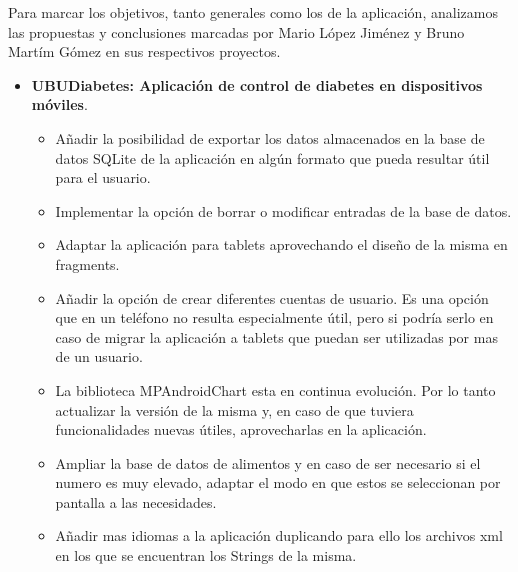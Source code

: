 
Para marcar los objetivos, tanto generales como los de la aplicación, analizamos las propuestas y conclusiones marcadas por Mario López Jiménez y Bruno Martím Gómez en sus respectivos proyectos.

\begin{itemize}
	\item  \textbf{UBUDiabetes: Aplicación de control de diabetes en dispositivos móviles}\cite{mario2016}.
	\begin{itemize}
		\item Añadir la posibilidad de exportar los datos almacenados en la base de datos SQLite de la aplicación en algún formato que pueda resultar útil para el usuario.
	\item Implementar la opción de borrar o modificar entradas de la base de datos.
	\item Adaptar la aplicación para tablets aprovechando el diseño de la misma en fragments.
	\item Añadir la opción de crear diferentes cuentas de usuario. Es una opción que en un teléfono no resulta especialmente útil, pero si podría serlo en caso de migrar la aplicación a tablets que puedan ser utilizadas por mas de un usuario.
	\item La biblioteca MPAndroidChart esta en continua evolución. Por lo tanto actualizar la versión de la misma y, en caso de que tuviera funcionalidades nuevas útiles, aprovecharlas en la aplicación.
	\item Ampliar la base de datos de alimentos y en caso de ser necesario si el numero es muy elevado, adaptar el modo en que 	estos se seleccionan por pantalla a las necesidades.
	\item Añadir mas idiomas a la aplicación duplicando para ello los archivos xml en los que se encuentran los Strings de la misma.
	\end{itemize}
	

\end{itemize}
